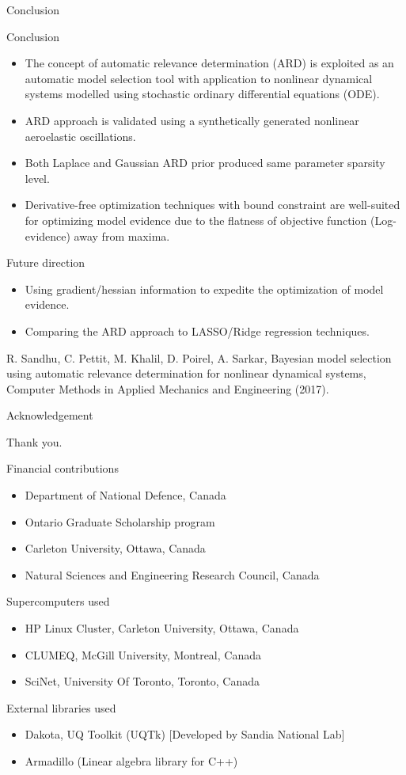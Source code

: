 \documentclass[xcolor=dvipsnames,10pt]{beamer}
\newcommand{\alertb}[1]{\begin{center}\alert{#1}\end{center}}
\newenvironment{newblockc}[1]
{\begin{block}{#1}\begin{itemize}\small
  \setlength{\itemsep}{4pt}}
{\end{itemize}\end{block}}
\newcommand{\itb}[1]{\item #1}
\begin{document}
\begin{frame}{Conclusion}
\begin{newblockc}{Conclusion}
\itb{The concept of automatic relevance determination (ARD) is exploited as an automatic model selection tool with application to nonlinear dynamical systems modelled using stochastic ordinary differential equations (ODE).}
\itb{ARD approach is validated using a synthetically generated nonlinear aeroelastic oscillations.}
\itb{Both Laplace and Gaussian ARD prior produced same parameter sparsity level.}
\itb{Derivative-free optimization techniques with bound constraint are well-suited for optimizing model evidence due to the flatness of objective function (Log-evidence) away from maxima.}
\end{newblockc}

\begin{newblockc}{Future direction}
\itb{Using gradient/hessian information to expedite the optimization of model evidence.}
\itb{Comparing the ARD approach to LASSO/Ridge regression techniques.}
\end{newblockc}

{\begin{center} \footnotesize R. Sandhu, C. Pettit, M. Khalil, D. Poirel, A. Sarkar, Bayesian model selection using automatic relevance determination for nonlinear dynamical systems, Computer Methods in Applied Mechanics and Engineering (2017).\end{center}}

\end{frame}

\begin{frame}{Acknowledgement}
 \alertb{Thank you.}
 
\begin{newblockc}{Financial contributions}
\itb{Department of National Defence, Canada}
\itb{Ontario Graduate Scholarship program}
 \itb{Carleton University, Ottawa, Canada}
 \itb{Natural Sciences and Engineering Research Council, Canada}
\end{newblockc}
\begin{newblockc}{Supercomputers used}
 \itb{HP Linux Cluster, Carleton University, Ottawa, Canada}
 \itb{CLUMEQ, McGill University, Montreal, Canada}
 \itb{SciNet, University Of Toronto, Toronto, Canada}
\end{newblockc}

\begin{newblockc}{External libraries used}
 \itb{Dakota, UQ Toolkit (UQTk) [Developed by Sandia National Lab]}
 \itb{Armadillo (Linear algebra library for C++)}
\end{newblockc}

\end{frame}
\end{document}

